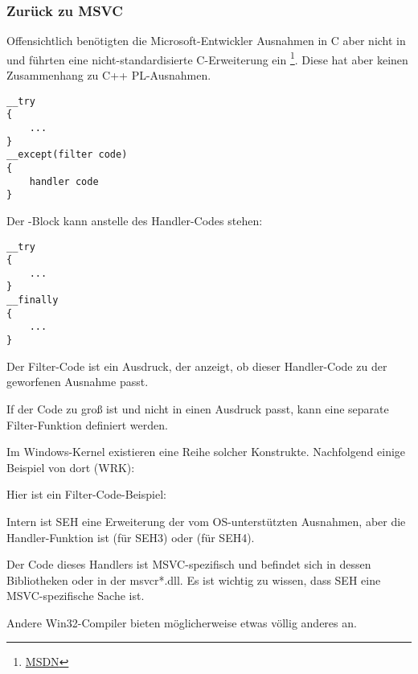 \subsubsection{Zurück zu MSVC}

Offensichtlich benötigten die Microsoft-Entwickler Ausnahmen in C aber nicht in
\Cpp und führten eine nicht-standardisierte C-Erweiterung ein \footnote{\href{http://go.yurichev.com/17057}{MSDN}}.
Diese hat aber keinen Zusammenhang zu  C++ \ac{PL}-Ausnahmen.

\begin{lstlisting}[style=customc]
__try
{
    ...
}
__except(filter code)
{
    handler code
}
\end{lstlisting}

Der -Block kann anstelle des Handler-Codes stehen:

\begin{lstlisting}[style=customc]
__try
{
    ...
}
__finally
{
    ...
}
\end{lstlisting}

Der Filter-Code ist ein Ausdruck, der anzeigt, ob dieser Handler-Code zu der
geworfenen Ausnahme passt.

If der Code zu groß ist und nicht in einen Ausdruck passt, kann eine separate
Filter-Funktion definiert werden.

Im Windows-Kernel existieren eine Reihe solcher Konstrukte.
Nachfolgend einige Beispiel von dort (\ac{WRK}):





Hier ist ein Filter-Code-Beispiel:



Intern ist SEH eine Erweiterung der vom \ac{OS}-unterstützten Ausnahmen,
aber die Handler-Funktion ist  (für SEH3) oder  (für SEH4).

Der Code dieses Handlers ist MSVC-spezifisch und befindet sich in dessen Bibliotheken
oder in der msvcr*.dll.
Es ist wichtig zu wissen, dass SEH eine MSVC-spezifische Sache ist.

Andere Win32-Compiler bieten möglicherweise etwas völlig anderes an.

